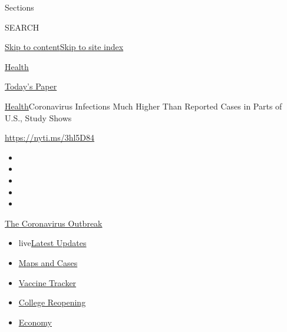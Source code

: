 Sections

SEARCH

\protect\hyperlink{site-content}{Skip to
content}\protect\hyperlink{site-index}{Skip to site index}

\href{https://www.nytimes.com/section/health}{Health}

\href{https://myaccount.nytimes.com/auth/login?response_type=cookie\&client_id=vi}{}

\href{https://www.nytimes.com/section/todayspaper}{Today's Paper}

\href{/section/health}{Health}\textbar{}Coronavirus Infections Much
Higher Than Reported Cases in Parts of U.S., Study Shows

\url{https://nyti.ms/3hl5D84}

\begin{itemize}
\item
\item
\item
\item
\item
\end{itemize}

\href{https://www.nytimes.com/news-event/coronavirus?action=click\&pgtype=Article\&state=default\&region=TOP_BANNER\&context=storylines_menu}{The
Coronavirus Outbreak}

\begin{itemize}
\tightlist
\item
  live\href{https://www.nytimes.com/2020/08/04/world/coronavirus-cases.html?action=click\&pgtype=Article\&state=default\&region=TOP_BANNER\&context=storylines_menu}{Latest
  Updates}
\item
  \href{https://www.nytimes.com/interactive/2020/us/coronavirus-us-cases.html?action=click\&pgtype=Article\&state=default\&region=TOP_BANNER\&context=storylines_menu}{Maps
  and Cases}
\item
  \href{https://www.nytimes.com/interactive/2020/science/coronavirus-vaccine-tracker.html?action=click\&pgtype=Article\&state=default\&region=TOP_BANNER\&context=storylines_menu}{Vaccine
  Tracker}
\item
  \href{https://www.nytimes.com/2020/08/02/us/covid-college-reopening.html?action=click\&pgtype=Article\&state=default\&region=TOP_BANNER\&context=storylines_menu}{College
  Reopening}
\item
  \href{https://www.nytimes.com/live/2020/08/04/business/stock-market-today-coronavirus?action=click\&pgtype=Article\&state=default\&region=TOP_BANNER\&context=storylines_menu}{Economy}
\end{itemize}

